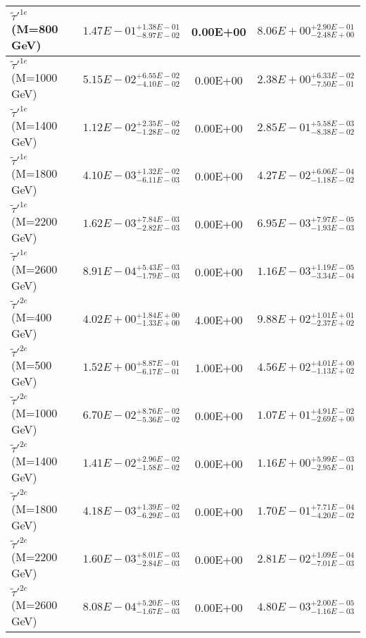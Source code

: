 \documentclass{article}
\begin{document}
\begin{center}
\begin{tabular}{ |l|c|c|c| }
 \hline
 $\tilde{\tau}'^{1e}$ (M=800 GeV) & $1.47E-01^{+1.38E-01}_{-8.97E-02}$ & 0.00E+00 & $8.06E+00^{+2.90E-01}_{-2.48E+00}$ \\
 \hline
 $\tilde{\tau}'^{1e}$ (M=1000 GeV) & $5.15E-02^{+6.55E-02}_{-4.10E-02}$ & 0.00E+00 & $2.38E+00^{+6.33E-02}_{-7.50E-01}$ \\
 \hline
 $\tilde{\tau}'^{1e}$ (M=1400 GeV) & $1.12E-02^{+2.35E-02}_{-1.28E-02}$ & 0.00E+00 & $2.85E-01^{+5.58E-03}_{-8.38E-02}$ \\
 \hline
 $\tilde{\tau}'^{1e}$ (M=1800 GeV) & $4.10E-03^{+1.32E-02}_{-6.11E-03}$ & 0.00E+00 & $4.27E-02^{+6.06E-04}_{-1.18E-02}$ \\
 \hline
 $\tilde{\tau}'^{1e}$ (M=2200 GeV) & $1.62E-03^{+7.84E-03}_{-2.82E-03}$ & 0.00E+00 & $6.95E-03^{+7.97E-05}_{-1.93E-03}$ \\
 \hline
 $\tilde{\tau}'^{1e}$ (M=2600 GeV) & $8.91E-04^{+5.43E-03}_{-1.79E-03}$ & 0.00E+00 & $1.16E-03^{+1.19E-05}_{-3.34E-04}$ \\
 \hline
 $\tilde{\tau}'^{2e}$ (M=400 GeV) & $4.02E+00^{+1.84E+00}_{-1.33E+00}$ & 4.00E+00 & $9.88E+02^{+1.01E+01}_{-2.37E+02}$ \\
 \hline
 $\tilde{\tau}'^{2e}$ (M=500 GeV) & $1.52E+00^{+8.87E-01}_{-6.17E-01}$ & 1.00E+00 & $4.56E+02^{+4.01E+00}_{-1.13E+02}$ \\
 \hline
 $\tilde{\tau}'^{2e}$ (M=1000 GeV) & $6.70E-02^{+8.76E-02}_{-5.36E-02}$ & 0.00E+00 & $1.07E+01^{+4.91E-02}_{-2.69E+00}$ \\
 \hline
 $\tilde{\tau}'^{2e}$ (M=1400 GeV) & $1.41E-02^{+2.96E-02}_{-1.58E-02}$ & 0.00E+00 & $1.16E+00^{+5.99E-03}_{-2.95E-01}$ \\
 \hline
 $\tilde{\tau}'^{2e}$ (M=1800 GeV) & $4.18E-03^{+1.39E-02}_{-6.29E-03}$ & 0.00E+00 & $1.70E-01^{+7.71E-04}_{-4.20E-02}$ \\
 \hline
 $\tilde{\tau}'^{2e}$ (M=2200 GeV) & $1.60E-03^{+8.01E-03}_{-2.84E-03}$ & 0.00E+00 & $2.81E-02^{+1.09E-04}_{-7.01E-03}$ \\
 \hline
 $\tilde{\tau}'^{2e}$ (M=2600 GeV) & $8.08E-04^{+5.20E-03}_{-1.67E-03}$ & 0.00E+00 & $4.80E-03^{+2.00E-05}_{-1.16E-03}$ \\
 \hline
 \end{tabular}
 \end{center}
 
\end{document}
